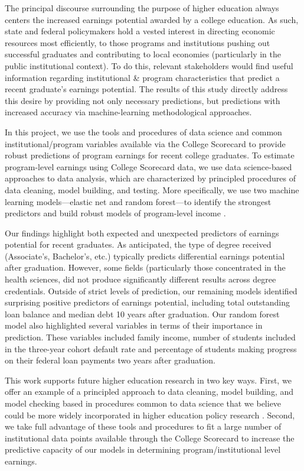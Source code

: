 \documentclass[a4paper, 12pt]{article}
\begin{document}
The principal discourse surrounding the purpose of higher education
always centers the increased earnings potential awarded by a college
education. As such, state and federal policymakers hold a vested
interest in directing economic resources most efficiently, to those
programs and institutions pushing out successful graduates and
contributing to local economies (particularly in the public
institutional context). To do this, relevant stakeholders would find
useful information regarding institutional \& program characteristics
that predict a recent graduate's earnings potential. The results of
this study directly address this desire by providing not only
necessary predictions, but predictions with increased accuracy via
machine-learning methodological approaches.

In this project, we use the tools and procedures of data science and
common institutional/program variables available via the College
Scorecard to provide robust predictions of program earnings for recent
college graduates. To estimate program-level earnings using College
Scorecard data, we use data science-based approaches to data analysis,
which are characterized by principled procedures of data cleaning,
model building, and testing. More specifically, we use two machine
learning models---elastic net and random forest---to identify the
strongest predictors and build robust models of program-level income
\parencite{Hastie_etal_2016, Kuhn_Silge_2022}.

Our findings highlight both expected and unexpected predictors of
earnings potential for recent graduates. As anticipated, the type of
degree received (Associate's, Bachelor's, etc.) typically predicts
differential earnings potential after graduation. However, some fields
(particularly those concentrated in the health sciences, did not
produce significantly different results across degree
credentials. Outside of strict levels of prediction, our remaining
models identified surprising positive predictors of earnings
potential, including total outstanding loan balance and median debt 10
years after graduation. Our random forest model also highlighted
several variables in terms of their importance in prediction. These
variables included family income, number of students included in the
three-year cohort default rate and percentage of students making
progress on their federal loan payments two years after graduation.

This work supports future higher education research in two key
ways. First, we offer an example of a principled approach to data
cleaning, model building, and model checking based in procedures
common to data science that we believe could be more widely
incorporated in higher education policy research
\parencite{Kuhn_Silge_2022}. Second, we take full advantage of these
tools and procedures to fit a large number of institutional data
points available through the College Scorecard to increase the
predictive capacity of our models in determining program/institutional
level earnings.
\end{document}
